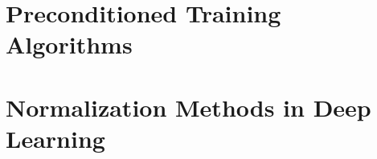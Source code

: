 \chapter{Preconditioned Training Algorithms}






\chapter{Normalization Methods in Deep Learning} 
 




